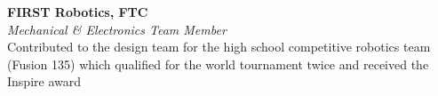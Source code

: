 \documentclass[margin,line]{resume}
\begin{document}
\begin{resume}
            \textbf{\listing FIRST Robotics, FTC} \vspace{2mm}\\\vspace{1mm}%
    \textsl{Mechanical \& Electronics Team Member} \hfill %
    	\\ Contributed to the design team for the high school competitive robotics team (Fusion 135) which qualified for the world tournament twice and received the Inspire award



\end{resume}
\end{document}

